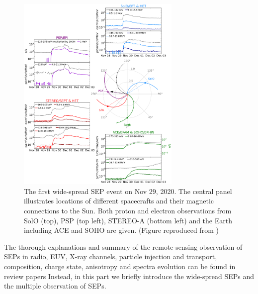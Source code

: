 \begin{figure}[!htb]
	\centering
	\includegraphics[width = 0.7\textwidth, height = 0.5\textheight]{images/2020-11-29_overview_plot.png}
	\caption[The first wide-spread \acl{SEP} event on Nov 29, 2020]{The first wide-spread \acl{SEP} event on Nov 29, 2020. The central panel illustrates locations of different spacecrafts and their magnetic connections to the Sun. Both proton and electron observations from \ac{SolO} (top), \ac{PSP} (top left), \ac{STEREO}-A (bottom left) and the Earth including \ac{ACE} and \ac{SOHO} are given. (Figure reproduced from \citet{Kollhoff-2021})}
	\label{Fig:SEP_widespread}
\end{figure}

The thorough explanations and summary of the remote-sensing observation of \acp{SEP} in radio, EUV, X-ray channels, particle injection and transport, composition, charge state, anisotropy and spectra evolution can be found in review papers \citep{reames2013two, Desai_Diacalone2016LRSP, Reames2021LNP}
Instead, in this part we briefly introduce the wide-spread \acp{SEP} and the multiple observation of \acp{SEP}.

